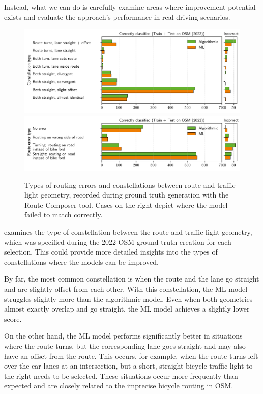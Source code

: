 Instead, what we can do is carefully examine areas where improvement potential exists and evaluate the approach's performance in real driving scenarios.

\begin{figure}[t]
\centering 
\includegraphics[width=\linewidth]{images/matching-constellations-osm-old.pdf} \\
\includegraphics[width=\linewidth]{images/matching-route-errors-osm-old.pdf}
\caption{Types of routing errors and constellations between route and traffic light geometry, recorded during ground truth generation with the Route Composer tool. Cases on the right depict where the model failed to match correctly.}
\label{fig:matching-constellations-osm}
\end{figure}

 examines the type of constellation between the route and traffic light geometry, which was specified during the 2022 OSM ground truth creation for each selection. This could provide more detailed insights into the types of constellations where the models can be improved.

By far, the most common constellation is when the route and the lane go straight and are slightly offset from each other. With this constellation, the ML model struggles slightly more than the algorithmic model. Even when both geometries almost exactly overlap and go straight, the ML model achieves a slightly lower score.

On the other hand, the ML model performs significantly better in situations where the route turns, but the corresponding lane goes straight and may also have an offset from the route. This occurs, for example, when the route turns left over the car lanes at an intersection, but a short, straight bicycle traffic light to the right needs to be selected. These situations occur more frequently than expected and are closely related to the imprecise bicycle routing in OSM.

